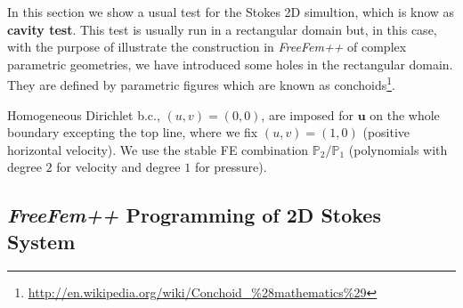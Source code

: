 \documentclass[12pt]{article}
\newcommand{\FF}{\textit{FreeFem++}\xspace}
\renewcommand{\P}{\mathbb{P}_}
\begin{document}
In this section we show a usual test for the Stokes 2D simultion,
which is know as \textbf{cavity test}. This test is usually run in a
rectangular domain but, in this case, with the purpose of illustrate
the construction in \FF of complex parametric geometries, we have
introduced some holes in the rectangular domain. They are defined by
parametric figures which are known as
conchoids\footnote{\url{http://en.wikipedia.org/wiki/Conchoid_\%28mathematics\%29}}.

Homogeneous Dirichlet b.c., $(u,v)=(0,0)$, are imposed for
$\mathbf{u}$ on the whole boundary excepting the top line, where we
fix $(u,v)=(1,0)$  (positive horizontal velocity). We use the stable
FE combination  $\P2/\P1$ (polynomials with degree $2$ for velocity
and degree $1$ for pressure).



\subsection{\FF Programming of 2D Stokes System}
\end{document}
